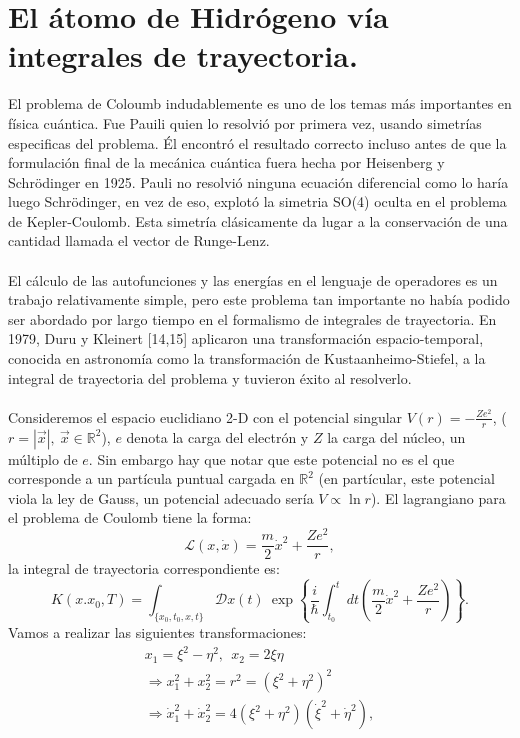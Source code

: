 \section{El átomo de Hidrógeno vía integrales de trayectoria.}
El problema de Coloumb indudablemente es uno de los temas más importantes en física cuántica. Fue Pauili quien lo resolvió por primera vez, usando simetrías especificas del problema. Él encontró el resultado correcto incluso antes de que la formulación final de la mecánica cuántica fuera hecha por Heisenberg y Schrödinger en 1925. Pauli no resolvió ninguna ecuación diferencial como lo haría luego Schrödinger, en vez de eso, explotó la simetria SO(4) oculta en el problema de Kepler-Coulomb. Esta simetría clásicamente da lugar a la conservación de una cantidad llamada el vector de Runge-Lenz.
\\
\\
El cálculo de las autofunciones y las energías en el lenguaje de operadores es un trabajo relativamente simple, pero este problema tan importante no había podido ser abordado por largo tiempo en el formalismo de integrales de trayectoria. En 1979, Duru y Kleinert [14,15] aplicaron una transformación espacio-temporal, conocida en astronomía como la transformación de Kustaanheimo-Stiefel, a la integral de trayectoria del problema y tuvieron éxito al resolverlo. 
\\
\\
Consideremos el espacio euclidiano 2-D con el potencial singular $V(r)=-\frac{Ze^2}{r}$, ($r=|\vec{x}|,\ \vec{x}\in\mathbb{R}^2 $), $e$ denota la carga del electrón y $Z$ la carga del núcleo, un múltiplo de $e$.
 Sin embargo hay que notar que este potencial no es el que corresponde a un partícula puntual cargada en $\mathbb{R}^2$ (en partícular, este potencial viola la ley de Gauss, un potencial adecuado sería $V\propto \ln r$). El lagrangiano para el problema de Coulomb tiene la forma:
\begin{equation}
\mathcal{L}(x,\dot{x})=\frac{m}{2}\dot{x}^{2}+\frac{Ze^{2}}{r},
\end{equation}
la integral de trayectoria correspondiente es:
\begin{equation}
K(x.x_{0},T)=\int_{\{x_{0},t_{0},x,t\}}\mathcal{D}x(t)\ \exp\left\{ \frac{i}{\hbar}\int_{t_{0}}^{t}dt\left(\frac{m}{2}\dot{x}^{2}+\frac{Ze^{2}}{r}\right)\right\}. 
\end{equation}
Vamos a realizar las siguientes transformaciones:
\begin{eqnarray}
&x_{1}=\xi^{2}-\eta^{2},\ \ x_{2}=2\xi\eta &\\
&\Rightarrow x_{1}^{2}+x_{2}^{2}=r^{2}=(\xi^{2}+\eta^{2})^{2}&\\
&\Rightarrow \dot{x}_{1}^{2}+\dot{x}_{2}^{2}=4(\xi^{2}+\eta^{2})(\dot{\xi}^{2}+\dot{\eta}^{2}),&
\end{eqnarray}
